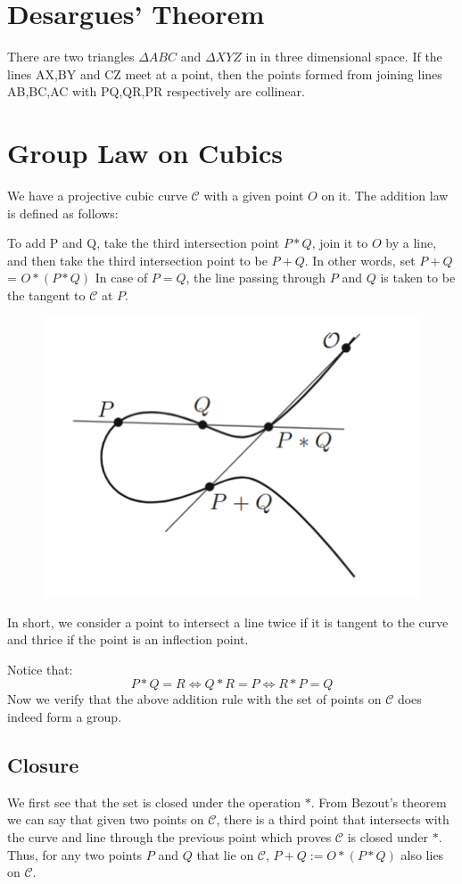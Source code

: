 \documentclass{report}
\begin{document}
\section*{Desargues’ Theorem}
There are two triangles $\varDelta ABC$ and $\varDelta XYZ$ in in three dimensional space.
If the lines AX,BY and CZ meet at a point, then the points formed from joining lines AB,BC,AC with PQ,QR,PR respectively are collinear.

\section*{Group Law on Cubics}

  We have a projective cubic curve $\mathcal{C}$ with a given point $O$ on it.
  The addition law is defined as follows:

  To add P and Q, take the third intersection point $P*Q$, join it to $O$ by a line, and then take the third intersection point to be $P+Q$. In other words, set $P + Q$ = $O*(P*Q)$
  In case of $P=Q$, the line passing through $P$ and $Q$ is taken to be the tangent to $\mathcal{C}$ at $P$.

  \begin{figure}[H]
    \centering
    \includegraphics[width=0.5\linewidth]{Grouplaw.png}
  \end{figure}

  In short, we consider a point to intersect a line twice if it is tangent to the curve and thrice if the point is an inflection point. 
  
  Notice that:
  \[P*Q=R\Longleftrightarrow  Q*R=P \Longleftrightarrow R*P=Q\]
  Now we verify that the above addition rule with the set of points on $\mathcal{C}$ does indeed form a group.

  \subsection*{Closure}
  We first see that the set is closed under the operation $*$.
  From Bezout's theorem we can say that given two points on $\mathcal{C}$, there is a third point that intersects with the curve and line through the previous point which proves $\mathcal{C}$ is closed under $*$.
  Thus, for any two points $P$ and $Q$ that lie on $\mathcal{C}$, $P+Q := O*(P*Q)$ also lies on $\mathcal{C}$.
\end{document}
